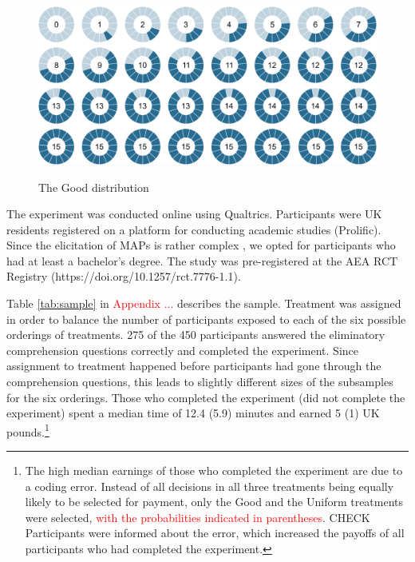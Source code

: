 \begin{figure}[h!]
  \centering
 {\includegraphics[width=\linewidth]{Left_15.pdf}}
  \caption{The Good distribution}
  \label{fig:TheGood}
\end{figure}

The experiment was conducted online using Qualtrics.
Participants were UK residents registered on a platform for conducting academic studies (Prolific).
Since the elicitation of MAPs is rather complex \citep{Quercia2016,Polipciuc2020}, we opted for participants who had at least a bachelor's degree.
The study was pre-registered at the AEA RCT Registry (https://doi.org/10.1257/rct.7776-1.1).

Table \ref{tab:sample} in \textcolor{red}{Appendix ...} describes the sample.
Treatment was assigned in order to balance the number of participants exposed to each of the six possible orderings of treatments.
275 of the 450 participants answered the eliminatory comprehension questions correctly and completed the experiment.
Since assignment to treatment happened before participants had gone through the comprehension questions, this leads to slightly different sizes of the subsamples for the six orderings.
Those who completed the experiment (did not complete the experiment) spent a median time of 12.4 (5.9) minutes and earned 5 (1) UK pounds.\footnote{
The high median earnings of those who completed the experiment are due to a coding error.
Instead of all decisions in all three treatments being equally likely to be selected for payment, only the Good and the Uniform treatments were selected, \textcolor{red}{with the probabilities indicated in parentheses}. CHECK
Participants were informed about the error, which increased the payoffs of all participants who had completed the experiment.
}


